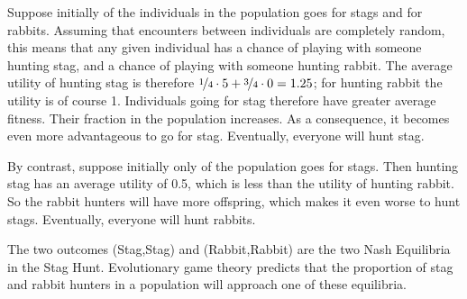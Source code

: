 Suppose initially  of the individuals in the population
goes for stags and  for rabbits. Assuming that
encounters between individuals are completely random, this means that
any given individual has a  chance of playing with
someone hunting stag, and a  chance of playing with
someone hunting rabbit. The average utility of hunting stag is
therefore $\nicefrac{1}{4} \cdot 5 + \nicefrac{3}{4} \cdot 0 = 1.25$;
for hunting rabbit the utility is of course 1. Individuals going for
stag therefore have greater average fitness. Their fraction in the
population increases. As a consequence, it becomes even more
advantageous to go for stag. Eventually, everyone will hunt stag.

By contrast, suppose initially only  of the population
goes for stags. Then hunting stag has an average utility of 0.5, which
is less than the utility of hunting rabbit. So the rabbit hunters will
have more offspring, which makes it even worse to hunt
stags. Eventually, everyone will hunt rabbits.

The two outcomes (Stag,Stag) and (Rabbit,Rabbit) are the two Nash
Equilibria in the Stag Hunt. Evolutionary game theory predicts that
the proportion of stag and rabbit hunters in a population will
approach one of these equilibria. 



